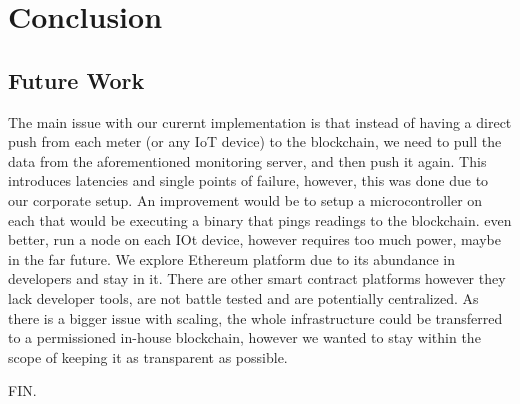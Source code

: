 \chapter{Conclusion}

\section{Future Work}
The main issue with our curernt implementation is that instead of having a direct push from each meter (or any IoT device) to the blockchain, we need to pull the data from the aforementioned monitoring server, and then push it again. This introduces latencies and single points of failure, however, this was done due to our corporate setup. An improvement would be to setup a microcontroller on each that would be executing a binary that pings readings to the blockchain. even better, run a node on each IOt device, however requires too much power, maybe in the far future. We explore Ethereum platform due to its abundance in developers and stay in it. There are other smart contract platforms however they lack developer tools, are not battle tested and are potentially centralized. As there is a bigger issue with scaling, the whole infrastructure could be transferred to a permissioned in-house blockchain, however we wanted to stay within the scope of keeping it as transparent as possible.

FIN.